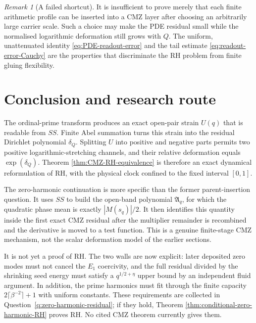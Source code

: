 \documentclass[11pt]{amsart}
\numberwithin{equation}{section}
\theoremstyle{plain}
\theoremstyle{definition}
\theoremstyle{remark}
\newtheorem{remark}[theorem]{Remark}
\begin{document}
\begin{remark}[A failed shortcut]
\label{rem:failed-shortcut}
It is insufficient to prove merely that each finite arithmetic profile can be
inserted into a CMZ layer after choosing an arbitrarily large carrier scale.
Such a choice may make the PDE residual small while the normalised logarithmic
deformation still grows with $Q$.  The uniform, unattenuated identity
\eqref{eq:PDE-readout-error} and the tail estimate
\eqref{eq:readout-error-Cauchy} are the properties that discriminate the RH
problem from finite gluing flexibility.
\end{remark}

\section{Conclusion and research route}
\label{sec:conclusion}

The ordinal-prime transform produces an exact open-pair strain $U(q)$ that is
readable from $SS$.  Finite Abel summation turns this strain into the residual
Dirichlet polynomial $\delta_Q$.  Splitting $U$ into positive and negative
parts permits two positive logarithmic-stretching channels, and their relative
deformation equals $\exp(\delta_Q)$.  Theorem
\ref{thm:CMZ-RH-equivalence} is therefore an exact dynamical reformulation of
RH, with the physical clock confined to the fixed interval $[0,1]$.

The zero-harmonic continuation is more specific than the former
parent-insertion question.  It uses $SS$ to build the open-band polynomial
$\mathfrak A_q$, for which the quadratic phase mean is exactly
$|M(s_q)|/2$.  It then identifies this quantity inside the first exact CMZ
residual after the multiplier remainder is recombined and the derivative is
moved to a test function.  This is a genuine finite-stage CMZ mechanism, not
the scalar deformation model of the earlier sections.

It is not yet a proof of RH.  The two walls are now explicit: later deposited
zero modes must not cancel the $E_1$ coercivity, and the full residual divided
by the shrinking seed energy must satisfy a $q^{1/2+\eta}$ upper bound by an
independent fluid argument.  In addition, the prime harmonics must fit through
the finite capacity $2\lceil\beta^{-2}\rceil+1$ with uniform constants.  These
requirements are collected in
Question~\ref{q:zero-harmonic-residual}; if they hold, Theorem
\ref{thm:conditional-zero-harmonic-RH} proves RH.  No cited CMZ theorem
currently gives them.
\end{document}
